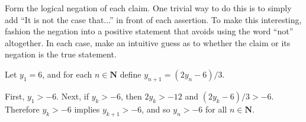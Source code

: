 \begin{exercise}
  Form the logical negation of each claim. One trivial way to do this is to simply add ``It is not the case that...'' in front of each assertion. To make this interesting, fashion the negation into a positive statement that avoids using the word ``not'' altogether. In each case, make an intuitive guess as to whether the claim or its negation is the true statement.
\end{exercise}
  
\begin{solution}
\end{solution}


\begin{exercise}
  Let $y_{1}=6$, and for each $n \in \mathbf{N}$ define $y_{n+1}=\left(2 y_{n}-6\right) / 3$.
\end{exercise}

\begin{solution}
  First, $y_1>-6$.
  Next, if $y_k>-6$, then $2y_k>-12$ and $(2y_k-6)/3>-6$. Therefore $y_k>-6$ implies $y_{k+1}>-6$, and so $y_n>-6$ for all $n\in\mathbf{N}$.
\end{solution}

